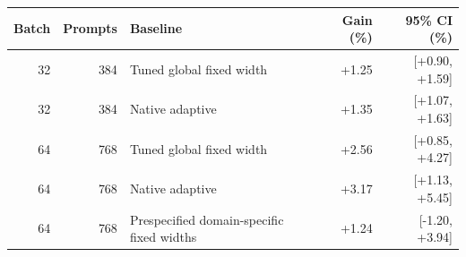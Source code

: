 \begin{tabular}{rrlrr}
\hline
Batch & Prompts & Baseline & Gain (\%) & 95\% CI (\%) \\
\hline
32 & 384 & Tuned global fixed width & +1.25 & [+0.90, +1.59] \\
32 & 384 & Native adaptive & +1.35 & [+1.07, +1.63] \\
64 & 768 & Tuned global fixed width & +2.56 & [+0.85, +4.27] \\
64 & 768 & Native adaptive & +3.17 & [+1.13, +5.45] \\
64 & 768 & Prespecified domain-specific fixed widths & +1.24 & [-1.20, +3.94] \\
\hline
\end{tabular}
